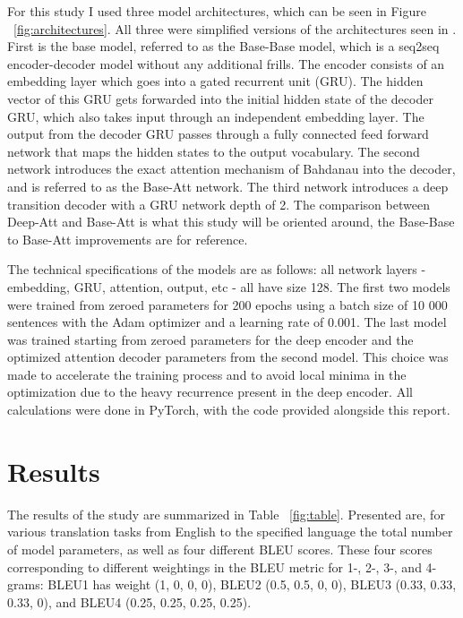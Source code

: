 \documentclass[twocolumn,superscriptaddress]{revtex4-1}
\begin{document}
For this study I used three model architectures, which can be seen in Figure ~\ref{fig:architectures}.
All three were simplified versions of the architectures seen in \cite{miceli-barone-etal-2017-deep}.
First is the base model, referred to as the Base-Base model, which is a seq2seq encoder-decoder model without any additional frills.
The encoder consists of an embedding layer which goes into a gated recurrent unit (GRU).
The hidden vector of this GRU gets forwarded into the initial hidden state of the decoder GRU, which also takes input through an independent embedding layer.
The output from the decoder GRU passes through a fully connected feed forward network that maps the hidden states to the output vocabulary.
The second network introduces the exact attention mechanism of Bahdanau \cite{bahdanau2016neural} into the decoder, and is referred to as the Base-Att network.
The third network introduces a deep transition decoder with a GRU network depth of 2.
The comparison between Deep-Att and Base-Att is what this study will be oriented around, the Base-Base to Base-Att improvements are for reference.

The technical specifications of the models are as follows: all network layers - embedding, GRU, attention, output, etc - all have size 128.
The first two models were trained from zeroed parameters for 200 epochs using a batch size of 10 000 sentences with the Adam optimizer and a learning rate of 0.001.
The last model was trained starting from zeroed parameters for the deep encoder and the optimized attention decoder parameters from the second model.
This choice was made to accelerate the training process and to avoid local minima in the optimization due to the heavy recurrence present in the deep encoder.
All calculations were done in PyTorch, with the code provided alongside this report.


\section{Results}
The results of the study are summarized in Table ~\ref{fig:table}. 
Presented are, for various translation tasks from English to the specified language the total number of model parameters, as well as four different BLEU scores. 
These four scores corresponding to different weightings in the BLEU metric for 1-, 2-, 3-, and 4-grams: BLEU1 has weight (1, 0, 0, 0), BLEU2 (0.5, 0.5, 0, 0), BLEU3 (0.33, 0.33, 0.33, 0), and BLEU4 (0.25, 0.25, 0.25, 0.25).
\end{document}
